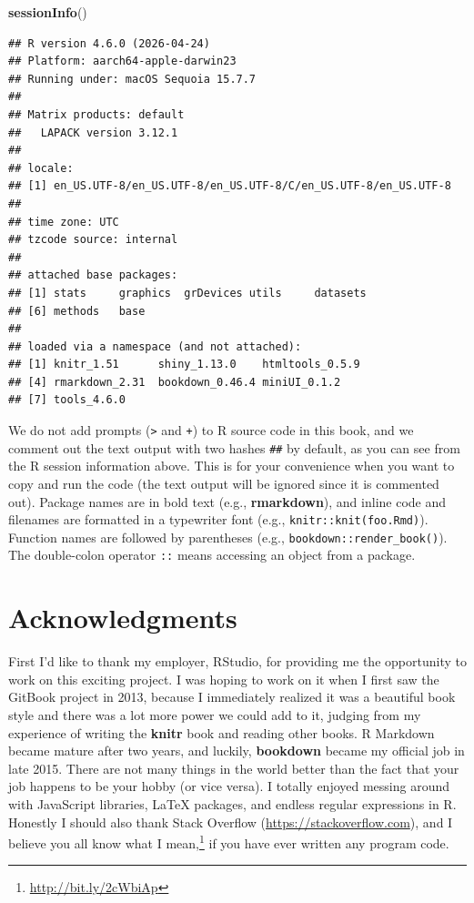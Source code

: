 \documentclass[
  12pt,
]{krantz}
\newenvironment{Shaded}{\begin{snugshade}}{\end{snugshade}}
\newcommand{\FunctionTok}[1]{\textcolor[rgb]{0.13,0.29,0.53}{\textbf{#1}}}
\newcommand{\NormalTok}[1]{#1}
\renewcommand{\href}[2]{#2\footnote{\url{#1}}}
\theoremstyle{definition}
\theoremstyle{definition}
\theoremstyle{definition}
\theoremstyle{definition}
\theoremstyle{remark}
\begin{document}
\begin{Shaded}
\begin{Highlighting}[]
\FunctionTok{sessionInfo}\NormalTok{()}
\end{Highlighting}
\end{Shaded}

\begin{verbatim}
## R version 4.6.0 (2026-04-24)
## Platform: aarch64-apple-darwin23
## Running under: macOS Sequoia 15.7.7
## 
## Matrix products: default
##   LAPACK version 3.12.1
## 
## locale:
## [1] en_US.UTF-8/en_US.UTF-8/en_US.UTF-8/C/en_US.UTF-8/en_US.UTF-8
## 
## time zone: UTC
## tzcode source: internal
## 
## attached base packages:
## [1] stats     graphics  grDevices utils     datasets 
## [6] methods   base     
## 
## loaded via a namespace (and not attached):
## [1] knitr_1.51      shiny_1.13.0    htmltools_0.5.9
## [4] rmarkdown_2.31  bookdown_0.46.4 miniUI_0.1.2   
## [7] tools_4.6.0
\end{verbatim}

We do not add prompts (\texttt{\textgreater{}} and \texttt{+}) to R source code in this book, and we comment out the text output with two hashes \texttt{\#\#} by default, as you can see from the R session information above. This is for your convenience when you want to copy and run the code (the text output will be ignored since it is commented out). Package names are in bold text (e.g., \textbf{rmarkdown}), and inline code and filenames are formatted in a typewriter font (e.g., \texttt{knitr::knit(\textquotesingle{}foo.Rmd\textquotesingle{})}). Function names are followed by parentheses (e.g., \texttt{bookdown::render\_book()}). The double-colon operator \texttt{::} means accessing an object from a package.

\section*{Acknowledgments}\label{acknowledgments}


First I'd like to thank my employer, RStudio, for providing me the opportunity to work on this exciting project. I was hoping to work on it when I first saw the GitBook project in 2013, because I immediately realized it was a beautiful book style and there was a lot more power we could add to it, judging from my experience of writing the \textbf{knitr} book \citep{xie2015} and reading other books. R Markdown became mature after two years, and luckily, \textbf{bookdown} became my official job in late 2015. There are not many things in the world better than the fact that your job happens to be your hobby (or vice versa). I totally enjoyed messing around with JavaScript libraries, LaTeX packages, and endless regular expressions in R. Honestly I should also thank Stack Overflow (\url{https://stackoverflow.com}), and I believe you all know \href{http://bit.ly/2cWbiAp}{what I mean,} if you have ever written any program code.
\end{document}
